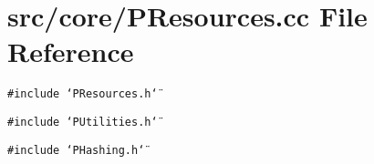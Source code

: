 \section{src/core/PResources.cc File Reference}
\label{PResources_8cc}


{\tt \#include \char`\"{}PResources.h\char`\"{}}\par
{\tt \#include \char`\"{}PUtilities.h\char`\"{}}\par
{\tt \#include \char`\"{}PHashing.h\char`\"{}}\par
